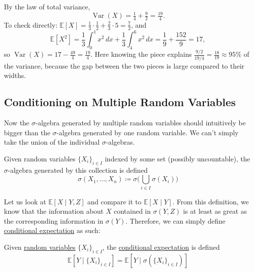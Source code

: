 \begin{example}
		By the law of total variance,
		\begin{equation}
			\operatorname{Var}(X) = \tfrac{1}{4} + \tfrac{9}{2} = \tfrac{19}{4}.
		\end{equation}
		To check directly: $\mathbb{E}[X] = \frac{1}{3} \cdot \frac{1}{2}
		+ \frac{2}{3} \cdot 5 = \frac{7}{2}$, and
		\begin{equation}
			\mathbb{E}[X^2] = \frac{1}{3} \int_0^1 x^2 \,dx + \frac{1}{3} \int_4^6 x^2 \,dx
			= \frac{1}{9} + \frac{152}{9} = 17,
		\end{equation}
		so $\operatorname{Var}(X) = 17 - \frac{49}{4} = \frac{19}{4}$. Here knowing the piece
		explains $\frac{9/2}{19/4} = \frac{18}{19} \approx 95\%$ of the variance, because the
		gap between the two pieces is large compared to their widths.
	\end{example}

\subsection{Conditioning on Multiple Random Variables}

  Now the $\sigma$-algebra generated by multiple random variables should intuitively be bigger than the $\sigma$-algebra generated by one random variable. We can't simply take the union of the individual $\sigma$-algebras. 

  \begin{definition}
    \label{def:sigma-algebra-generated-by-multiple-random}
    Given random variables $\{X_i\}_{i \in I}$ indexed by some set (possibly uncountable), the $\sigma$-algebra generated by this collection is defined 
    \begin{equation}
      \sigma(X_1, \ldots, X_n) \coloneqq \sigma \bigg( \bigcup_{i \in I} \sigma(X_i) \bigg)
    \end{equation}
  \end{definition}

  Let us look at $\mathbb{E}[X \mid Y, Z]$ and compare it to $\mathbb{E}[X \mid Y]$. From this definition, we know that the information about $X$ contained in $\sigma(Y, Z)$ is at least as great as the corresponding information in $\sigma(Y)$. Therefore, we can simply define \hyperref[def:cond-exp]{conditional expectation} as such: 

  \begin{definition}
    \label{def:conditional-expectation-given-multiple-random}
    Given \hyperref[def:random-variable]{random variables} $\{X_i\}_{i \in I}$, the \hyperref[def:cond-exp]{conditional expectation} is defined 
    \begin{equation}
      \mathbb{E}[Y \mid \{X_i\}_{i \in I} ] = \mathbb{E}[ Y \mid \sigma(\{X_i \}_{i \in I})]
    \end{equation}
  \end{definition}

